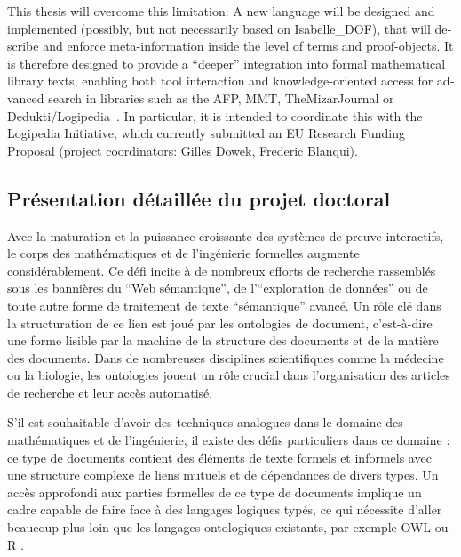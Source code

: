 \documentclass[a4paper,10pt]{article}
\begin{document}
\begin{english}
This thesis will overcome this limitation:
A new language will be designed and implemented
(possibly, but not necessarily based on Isabelle\_DOF),
that will describe and enforce meta-information
inside the level of terms and proof-objects.
It is therefore designed to provide a \enquote{deeper} integration
into formal mathematical library texts,
enabling both tool interaction and knowledge-oriented access
for advanced search in libraries such as the AFP, MMT, TheMizarJournal
or Dedukti/Logipedia~\cite{afp,mmt,TheMizarJournal,dedukti}.
In particular, it is intended to coordinate this
with the Logipedia Initiative,
which currently submitted an EU Research Funding Proposal
(project coordinators: Gilles Dowek, Frederic Blanqui).

\end{english}

\subsection*{Présentation détaillée du projet doctoral}

Avec la maturation et la puissance croissante
des systèmes de preuve interactifs,
le corps des mathématiques et de l'ingénierie formelles augmente considérablement.
Ce défi incite à de nombreux efforts de recherche
rassemblés sous les bannières du \enquote{Web sémantique},
de l'\enquote{exploration de données}
ou de toute autre forme de traitement de texte \enquote{sémantique} avancé.
Un rôle clé dans la structuration de ce lien est joué
par les ontologies de document,
c'est-à-dire une forme lisible par la machine de la structure des documents
et de la matière des documents.
Dans de nombreuses disciplines scientifiques comme la médecine ou la biologie,
les ontologies jouent un rôle crucial
dans l'organisation des articles de recherche et leur accès automatisé.

S'il est souhaitable d'avoir des techniques analogues
dans le domaine des mathématiques et de l'ingénierie,
il existe des défis particuliers dans ce domaine :
ce type de documents contient des éléments de texte formels et informels
avec une structure complexe de liens mutuels et de dépendances de divers types.
Un accès approfondi aux parties formelles de ce type de documents implique
un cadre capable de faire face à des langages logiques typés,
ce qui nécessite d'aller beaucoup plus loin
que les langages ontologiques existants,
par exemple OWL ou R \cite {owl2012,protege,owlgred,rontorium}.
\end{document}

